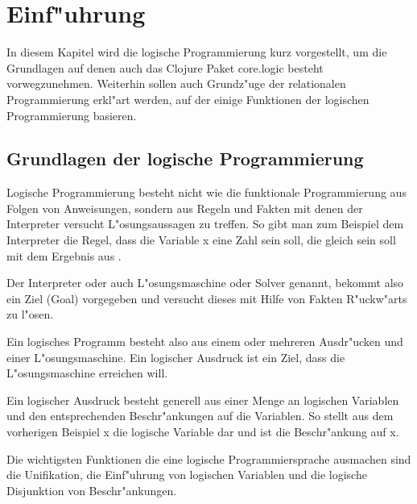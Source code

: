 \section{Einf"uhrung}

In diesem Kapitel wird die logische Programmierung kurz vorgestellt, um die Grundlagen auf denen auch das Clojure Paket core.logic besteht vorwegzunehmen. Weiterhin sollen auch Grundz"uge der relationalen Programmierung erkl"art werden, auf der einige Funktionen der logischen Programmierung basieren.

\subsection{Grundlagen der logische Programmierung}

Logische Programmierung besteht nicht wie die funktionale Programmierung aus Folgen von Anweisungen, sondern aus Regeln und Fakten mit denen der Interpreter versucht L"osungsaussagen zu treffen. So gibt man zum Beispiel dem Interpreter die Regel, dass die Variable x eine Zahl sein soll, die gleich sein soll mit dem Ergebnis aus .

Der Interpreter oder auch L"osungsmaschine oder Solver genannt, bekommt also ein Ziel (Goal) vorgegeben und versucht dieses mit Hilfe von Fakten R"uckw"arts zu l"osen.


Ein logisches Programm besteht also aus einem oder mehreren Ausdr"ucken und einer L"osungsmaschine. Ein logischer Ausdruck ist ein Ziel, dass die L"osungsmaschine erreichen will.

Ein logischer Ausdruck besteht generell aus einer Menge an logischen Variablen und den entsprechenden Beschr"ankungen auf die Variablen. So stellt aus dem vorherigen Beispiel x die logische Variable dar und  ist die Beschr"ankung auf x.


Die wichtigsten Funktionen die eine logische Programmiersprache ausmachen sind die Unifikation, die Einf"uhrung von logischen Variablen und die logische Disjunktion von Beschr"ankungen.
